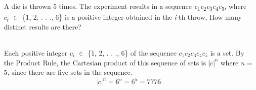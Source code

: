 A die is thrown 5 times. The experiment results in a sequence \textit{c}\textsubscript{1}\textit{c}\textsubscript{2}\textit{c}\textsubscript{3}\textit{c}\textsubscript{4}\textit{c}\textsubscript{5}, where $c_i$ $\in$ \{1, 2, . . ., 6\} is a positive integer obtained in the \textit{i}-th throw. How many distinct results are there?

\begin{solution}\ \\
Each positive integer \(c_i\) $\in$ \{1, 2, . . ., 6\} of the sequence \(c_1c_2c_3c_4c_5\) is a set. By the Product Rule, the Cartesian product of this sequence of sets is $|c|^n$ where \textit{n} = 5, since there are five sets in the sequence. \[|c|^n = 6^n = 6^5 = 7776\]
\end{solution}